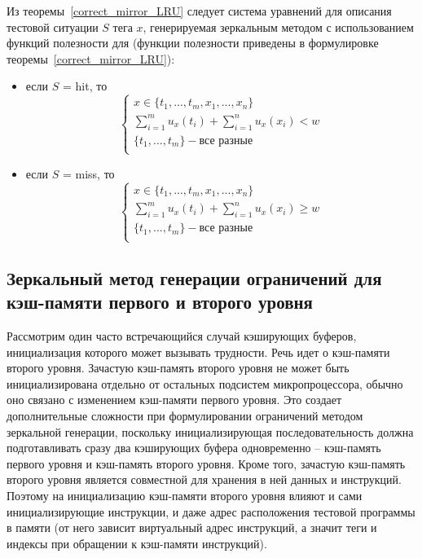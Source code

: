 Из теоремы~\ref{correct_mirror_LRU} следует система уравнений для
описания тестовой ситуации $S$ тега $x$, генерируемая зеркальным
методом с использованием функций полезности для \LRU (функции
полезности приведены в формулировке
теоремы~\ref{correct_mirror_LRU}):
\begin{itemize}
\item если $S$ = hit, то
$$
\left\{\begin{array}{l} x \in \{t_1, ..., t_m, x_1, ..., x_n\}\\
\sum\limits_{i=1}^m u_x(t_i) + \sum\limits_{i=1}^n u_x(x_i) < w\\
\{t_1, ..., t_m\} - \mbox{все разные}\\
\end{array} \right.
$$
\item если $S$ = miss, то
$$
\left\{\begin{array}{l} x \in \{t_1, ..., t_m, x_1, ..., x_n\}\\
\sum\limits_{i=1}^m u_x(t_i) + \sum\limits_{i=1}^n u_x(x_i)
\geqslant w\\
\{t_1, ..., t_m\} - \mbox{все разные}\\
\end{array} \right.
$$
\end{itemize}


\subsection{Зеркальный метод генерации ограничений для кэш-памяти
первого и второго уровня}

Рассмотрим один часто встречающийся случай кэширующих буферов,
инициализация которого может вызывать трудности. Речь идет о
кэш-памяти второго уровня. Зачастую кэш-память второго уровня не
может быть инициализирована отдельно от остальных подсистем
микропроцессора, обычно оно связано с изменением кэш-памяти первого
уровня. Это создает дополнительные сложности при формулировании
ограничений методом зеркальной генерации, поскольку инициализирующая
последовательность должна подготавливать сразу два кэширующих буфера
одновременно -- кэш-память первого уровня и кэш-память второго
уровня. Кроме того, зачастую кэш-память второго уровня является
совместной для хранения в ней данных и инструкций. Поэтому на
инициализацию кэш-памяти второго уровня влияют и сами
инициализирующие инструкции, и даже адрес расположения тестовой
программы в памяти (от него зависит виртуальный адрес инструкций, а
значит теги и индексы при обращении к кэш-памяти инструкций).

